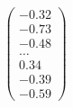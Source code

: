 \documentclass[preview]{standalone}
\begin{document}
\begin{align*}
\begin{pmatrix} -0.32 \\ -0.73 \\ -0.48 \\ \dots \\ 0.34 \\ -0.39 \\ -0.59 \end{pmatrix}
\end{align*}
\end{document}

